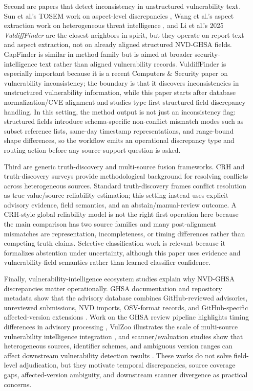 Second are papers that detect inconsistency in unstructured vulnerability text. Sun et al.'s TOSEM work on aspect-level discrepancies \cite{Sun2023}, Wang et al.'s aspect extraction work on heterogeneous threat intelligence \cite{Wang2025Aspects}, and Li et al.'s 2025 \emph{VuldiffFinder} \cite{Li2025VuldiffFinder} are the closest neighbors in spirit, but they operate on report text and aspect extraction, not on already aligned structured NVD-GHSA fields. GapFinder \cite{GapFinder2021} is similar in method family but is aimed at broader security-intelligence text rather than aligned vulnerability records. VuldiffFinder is especially important because it is a recent Computers \& Security paper on vulnerability inconsistency; the boundary is that it discovers inconsistencies in unstructured vulnerability information, while this paper starts after database normalization/CVE alignment and studies type-first structured-field discrepancy handling. In this setting, the method output is not just an inconsistency flag: structured fields introduce schema-specific non-conflict mismatch modes such as subset reference lists, same-day timestamp representations, and range-bound shape differences, so the workflow emits an operational discrepancy type and routing action before any source-support question is asked.

Third are generic truth-discovery and multi-source fusion frameworks. CRH \cite{CRH2016} and truth-discovery surveys \cite{Wang2024TruthSurvey} provide methodological background for resolving conflicts across heterogeneous sources. Standard truth-discovery frames conflict resolution as true-value/source-reliability estimation; this setting instead uses explicit advisory evidence, field semantics, and an abstain/manual-review outcome. A CRH-style global reliability model is not the right first operation here because the main comparison has two source families and many post-alignment mismatches are representation, incompleteness, or timing differences rather than competing truth claims. Selective classification work \cite{Goren2024HSC} is relevant because it formalizes abstention under uncertainty, although this paper uses evidence and vulnerability-field semantics rather than learned classifier confidence.

Finally, vulnerability-intelligence ecosystem studies explain why NVD-GHSA discrepancies matter operationally. GHSA documentation and repository metadata show that the advisory database combines GitHub-reviewed advisories, unreviewed submissions, NVD imports, OSV-format records, and GitHub-specific affected-version extensions \cite{GHSAAbout2026,GHSARepo2026}. Work on the GHSA review pipeline highlights timing differences in advisory processing \cite{Segal2026GHSA}, VulZoo illustrates the scale of multi-source vulnerability intelligence integration \cite{Ruan2024VulZoo}, and scanner/evaluation studies show that heterogeneous sources, identifier schemes, and ambiguous version ranges can affect downstream vulnerability detection results \cite{Churakova2026VEX,Mandl2026VulnDetection}. These works do not solve field-level adjudication, but they motivate temporal discrepancies, source coverage gaps, affected-version ambiguity, and downstream scanner divergence as practical concerns.

